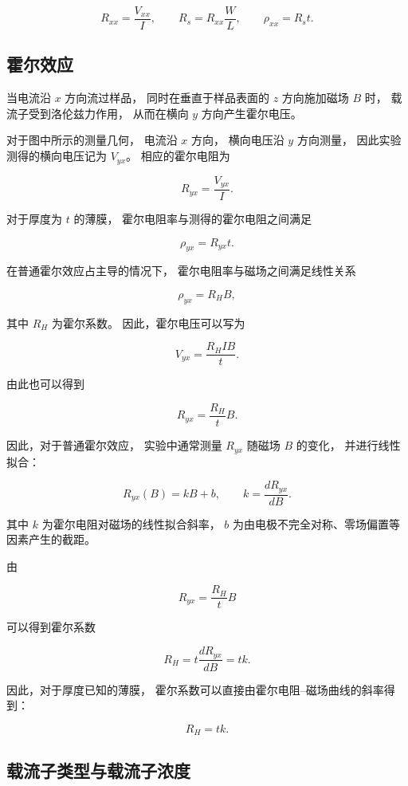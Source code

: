 \documentclass[openany]{book}
\theoremstyle{mydefinition}
\theoremstyle{myplain}
\begin{document}
\[
R_{xx}=\frac{V_{xx}}{I},
\qquad
R_s=R_{xx}\frac{W}{L},
\qquad
\rho_{xx}=R_s t.
\]


\subsection{霍尔效应}

当电流沿 \(x\) 方向流过样品，
同时在垂直于样品表面的 \(z\) 方向施加磁场 \(B\) 时，
载流子受到洛伦兹力作用，
从而在横向 \(y\) 方向产生霍尔电压。

对于图中所示的测量几何，
电流沿 \(x\) 方向，
横向电压沿 \(y\) 方向测量，
因此实验测得的横向电压记为 \(V_{yx}\)。
相应的霍尔电阻为

\[
R_{yx}
=
\frac{V_{yx}}{I}.
\]

对于厚度为 \(t\) 的薄膜，
霍尔电阻率与测得的霍尔电阻之间满足

\[
\rho_{yx}
=
R_{yx}t.
\]

在普通霍尔效应占主导的情况下，
霍尔电阻率与磁场之间满足线性关系

\[
\rho_{yx}
=
R_H B,
\]

其中 \(R_H\) 为霍尔系数。
因此，霍尔电压可以写为

\[
V_{yx}
=
\frac{R_H I B}{t}.
\]

由此也可以得到

\[
R_{yx}
=
\frac{R_H}{t}B.
\]

因此，对于普通霍尔效应，
实验中通常测量 \(R_{yx}\) 随磁场 \(B\) 的变化，
并进行线性拟合：

\[
R_{yx}(B)
=
kB+b,
\qquad
k=\frac{dR_{yx}}{dB}.
\]

其中 \(k\) 为霍尔电阻对磁场的线性拟合斜率，
\(b\) 为由电极不完全对称、零场偏置等因素产生的截距。

由

\[
R_{yx}
=
\frac{R_H}{t}B
\]

可以得到霍尔系数

\[
R_H
=
t\frac{dR_{yx}}{dB}
=
tk.
\]

因此，对于厚度已知的薄膜，
霍尔系数可以直接由霍尔电阻--磁场曲线的斜率得到：

\[
R_H=tk.
\]


\subsection{载流子类型与载流子浓度}
\end{document}
